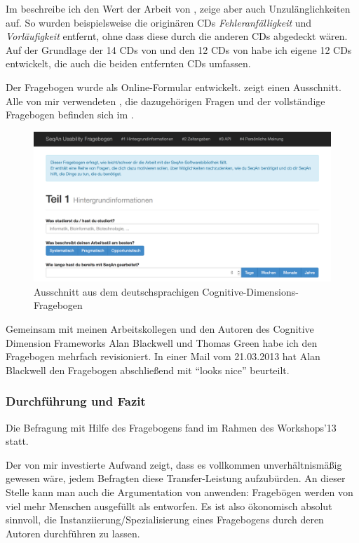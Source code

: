 Im  beschreibe ich den Wert der Arbeit von \cite{Anonymous:9HSMlhmF}, zeige aber auch Unzulänglichkeiten auf. So wurden beispielsweise die originären CDs \textit{Fehleranfälligkeit} und \textit{Vorläufigkeit} entfernt, ohne dass diese durch die anderen CDs abgedeckt wären. Auf der Grundlage der 14 CDs von \cite{161956} und den 12 CDs von \cite{Anonymous:9HSMlhmF} habe ich eigene 12 CDs entwickelt, die auch die beiden entfernten CDs umfassen.

Der Fragebogen wurde als Online-Formular entwickelt.  zeigt einen Ausschnitt. Alle von mir verwendeten , die dazugehörigen Fragen und der vollständige Fragebogen befinden sich im .

\begin{figure}
  \centering
    \includegraphics[width=1.0\linewidth]{Figures/cd-fragebogen-de-part.png}
    \caption{Ausschnitt aus dem deutschsprachigen Cognitive-Dimensions-Fragebogen}
    \label{fig:cd-fragebogen-de-part}
\end{figure}

Gemeinsam mit meinen Arbeitskollegen und den Autoren des Cognitive Dimension Frameworks Alan Blackwell und Thomas Green habe ich den Fragebogen mehrfach revisioniert. In einer Mail vom 21.03.2013 hat Alan Blackwell den Fragebogen abschließend mit ``looks nice'' beurteilt.


\subsubsection{Durchführung und Fazit}

Die Befragung mit Hilfe des Fragebogens fand im Rahmen des Workshops'13 statt.

Der von mir investierte Aufwand zeigt, dass es vollkommen unverhältnismäßig gewesen wäre, jedem Befragten diese Transfer-Leistung aufzubürden. An dieser Stelle kann man auch die Argumentation von \cite{Henning:2007kg,Ellis:2007kv} anwenden: Fragebögen werden von viel mehr Menschen ausgefüllt als entworfen. Es ist also ökonomisch absolut sinnvoll, die Instanziierung/Spezialisierung eines Fragebogens durch deren Autoren durchführen zu lassen.


